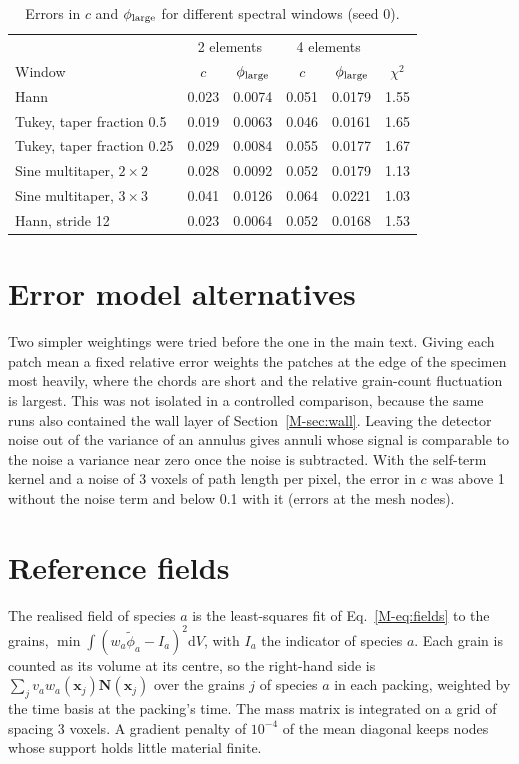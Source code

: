 \documentclass[11pt]{article}
\newcommand{\dd}{\mathrm{d}}
\newcommand{\x}{\bm{x}}
\begin{document}
\begin{table}[h]
\centering
\caption{Errors in $c$ and $\phi_{\rm large}$ for different spectral windows
(seed 0).}
\label{tab:windows}
\begin{tabular}{lccccc}
\toprule
 & \multicolumn{2}{c}{2 elements} & \multicolumn{2}{c}{4 elements} & \\
Window & $c$ & $\phi_{\rm large}$ & $c$ & $\phi_{\rm large}$ & $\chi^2$ \\
\midrule
Hann & 0.023 & 0.0074 & 0.051 & 0.0179 & 1.55 \\
Tukey, taper fraction 0.5 & 0.019 & 0.0063 & 0.046 & 0.0161 & 1.65 \\
Tukey, taper fraction 0.25 & 0.029 & 0.0084 & 0.055 & 0.0177 & 1.67 \\
Sine multitaper, $2\times2$ & 0.028 & 0.0092 & 0.052 & 0.0179 & 1.13 \\
Sine multitaper, $3\times3$ & 0.041 & 0.0126 & 0.064 & 0.0221 & 1.03 \\
Hann, stride 12 & 0.023 & 0.0064 & 0.052 & 0.0168 & 1.53 \\
\bottomrule
\end{tabular}
\end{table}

\section{Error model alternatives}

Two simpler weightings were tried before the one in the main text. Giving
each patch mean a fixed relative error weights the patches at the edge of
the specimen most heavily, where the chords are short and the relative
grain-count fluctuation is largest. This was not isolated in a controlled
comparison, because the same runs also contained the wall layer of
Section~\ref{M-sec:wall}. Leaving the detector noise out of the variance of
an annulus gives annuli whose signal is comparable to the noise a variance
near zero once the noise is subtracted. With the self-term kernel and a
noise of 3 voxels of path length per pixel, the error in $c$ was above 1
without the noise term and below 0.1 with it (errors at the mesh nodes).

\section{Reference fields}\label{sec:reference}

The realised field of species $a$ is the least-squares fit of
Eq.~\eqref{M-eq:fields} to the grains,
$\min\int(w_a\tilde\phi_a-I_a)^2\dd V$, with $I_a$ the indicator of
species $a$. Each grain is counted as its volume at its centre, so the
right-hand side is $\sum_j v_a w_a(\x_j)\bm N(\x_j)$ over the grains $j$ of
species $a$ in each packing, weighted by the time basis at the packing's
time. The mass matrix is integrated on a grid of spacing 3 voxels. A
gradient penalty of $10^{-4}$ of the mean diagonal keeps nodes whose support
holds little material finite.
\end{document}
